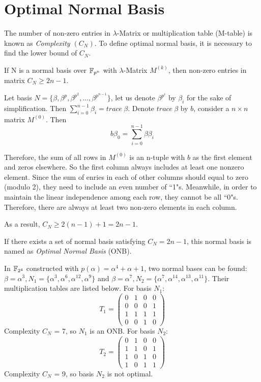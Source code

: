 \section{Optimal Normal Basis}
\label{append:ONB}
The number of non-zero entries in $\lambda$-Matrix or multiplication table (M-table) is known as \emph{Complexity $(C_N)$}.
To define optimal normal basis, it is necessary to find the lower bound of $C_N$.
\begin{Theorem}
If N is a normal basis over ${\mathbb{F}}_{p^n}$ with $\lambda$-Matrix $M^{(k)}$, then non-zero entries in matrix $C_N\geq 2n-1$.
\end{Theorem}
\begin{Proof}
Let basis $N = \{\beta, \beta^p, \beta^{p^2},\dots, \beta^{p^{n-1}}\}$, let us denote $\beta^{p^i}$ by $\beta_i$ for the sake of simplification.
Then $\sum_{i=0}^{n-1} \beta_i = trace\ \beta$. 
Denote $trace\ \beta$ by $b$, consider a $n\times n$ matrix $M^{(0)}$. Then
$$b\beta_0 = \sum_{i=0}^{n-1} \beta \beta_i$$

Therefore, the sum of all rows in $M^{(0)}$ is an n-tuple with $b$ as the first element and zeros elsewhere.
So the first column always includes at least one nonzero element. 
Since the sum of enries in each of other columns should equal to zero (modulo 2), they 
need to include an even number of ``1"s.
Meanwhile, in order to maintain the linear independence among each row, they cannot be all ``0"s. 
Therefore, there are always at least two non-zero elements in each column.

As a result, $C_N \geq 2(n-1)+1  = 2n-1$.
\end{Proof}

If there exists a set of normal basis satisfying $C_N = 2n - 1$, this normal basis is named as 
\emph{Optimal Normal Basis} (ONB).

\begin{Example}
\label{ex:app4}
In ${\mathbb{F}}_{2^4}$ constructed with $p(\alpha) = \alpha^4 + \alpha + 1$, two normal bases can be found:
$\beta = \alpha^3, N_1 = \{ \alpha^3, \alpha^6, \alpha^{12}, \alpha^9\}$ and 
$\beta = \alpha^7, N_2 = \{\alpha^7, \alpha^{14}, \alpha^{13}, \alpha^{11}\}$. 
Their multiplication tables are listed below. For basis $N_1$:
\begin{equation}
T_1 = \left(
\begin{array}{lccr}
0 & 1 & 0 & 0\\
0 & 0 & 0 & 1\\
1 & 1 & 1 & 1\\
0 & 0 & 1 & 0
\end{array} \right)
\end{equation}
Complexity $C_N$ = 7, so $N_1$ is an ONB. For basis $N_2$:
\begin{equation}
T_2 = \left(
\begin{array}{lccr}
0 & 1 & 0 & 0\\
1 & 1 & 0 & 1\\
1 & 0 & 1 & 0\\
1 & 0 & 1 & 1
\end{array} \right)
\end{equation}
Complexity $C_N$ = 9, so basis $N_2$ is not optimal.
\end{Example}

